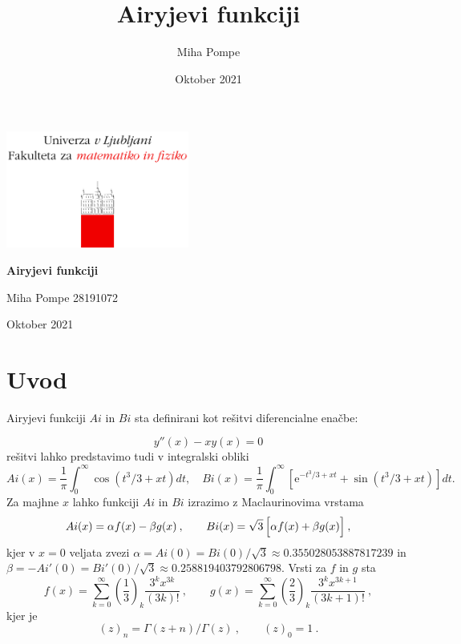 \documentclass[12pt, a4paper]{article}
\title{Airyjevi funkciji}
\author{Miha Pompe}
\date{Oktober 2021}
\begin{document}
\begin{titlepage}
	\centering
 	\includegraphics[width=0.45\textwidth]{logo_fmf_uni-lj_sl_veliki.png}\par\vspace{1cm}

	\vspace{1cm}

	\vspace{1.5cm}
	{\huge\bfseries Airyjevi funkciji\par}
	\vspace{2cm}
	{\Large Miha Pompe 28191072\par}
	\vfill

	\vfill

	{\large Oktober 2021\par}
\end{titlepage}
\thispagestyle{empty}
\clearpage
{}
\newpage


\section{Uvod}
Airyjevi funkciji $Ai$ in $Bi$ sta definirani kot rešitvi diferencialne enačbe:

\begin{equation*}
  y''(x) -xy(x) = 0
\end{equation*}
%
rešitvi lahko predstavimo tudi v integralski obliki
%
\begin{equation*}
  Ai(x) = \frac{1}{\pi} \int_0^\infty \cos (t^3/3 + x t) dt,\quad
  Bi(x) = \frac{1}{\pi} \int_0^\infty \left[ \mathrm{e}^{-t^3/3 + x t} + \sin (t^3/3 + x t) \right] dt.
\end{equation*}
%
Za majhne $x$ lahko funkciji $Ai$ in $Bi$ izrazimo
z Maclaurinovima vrstama
%
\begin{equation*}
  Ai(x) = \alpha f(x) - \beta g(x)\>,\qquad
  Bi(x) = \sqrt{3}\, \Bigl[\alpha f (x) + \beta g(x) \Bigr]\>,
\end{equation*}
kjer v $x=0$ veljata zvezi
%
$\alpha = Ai(0) = Bi(0)/\sqrt{3}\approx 0.355028053887817239$ in
$\beta = -Ai'(0) = Bi'(0)/\sqrt{3}\approx 0.258819403792806798$.
Vrsti za $f$ in $g$ sta
\begin{equation*}
  f(x) = \sum_{k=0}^\infty
  \left(\frac{1}{3}\right)_k \frac{3^k x^{3k}}{(3k)!} \>, \qquad
  g(x) = \sum_{k=0}^\infty
  \left(\frac{2}{3}\right)_k \frac{3^k x^{3k+1}}{(3k+1)!} \>,
\end{equation*}
kjer je
\begin{equation*}
  (z)_n = \Gamma(z+n)/\Gamma(z) \>, \qquad (z)_0 = 1 \>.
\end{equation*}
\end{document}
